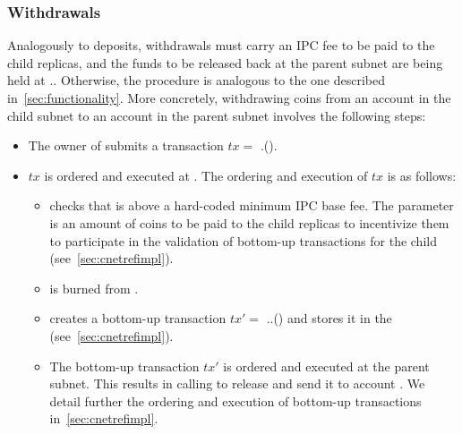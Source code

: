 \subsubsection{Withdrawals}
Analogously to deposits, withdrawals must carry an IPC fee to be paid to the child replicas, and the funds to be released back at the parent subnet  are being held at .\gw. Otherwise, the procedure is analogous to the one described in~\cref{sec:functionality}. More concretely, withdrawing  coins from an account  in the child subnet  to an account  in the parent subnet  involves the following steps:
\begin{itemize}
\item The owner of  submits a transaction $tx=$ \gw.().
 \item $tx$ is ordered and executed at . The ordering and execution of $tx$ is as follows:
 \begin{itemize}
        \item \gw checks that  is above a hard-coded minimum IPC base fee. The parameter  is an amount of coins to be paid to the child replicas to incentivize them to participate in the validation of bottom-up transactions for the child (see~\cref{sec:cnetrefimpl}). 
        \item {} is burned from .
        \item \gw creates a bottom-up transaction $tx'=$ ..() and stores it in the \bqueue (see~\cref{sec:cnetrefimpl}).
        \item The bottom-up transaction $tx'$ is ordered and executed at the parent subnet. This results in  calling \gw to release  and send it to account . We detail further the ordering and execution of bottom-up transactions in~\cref{sec:cnetrefimpl}.
    \end{itemize}
\end{itemize}

